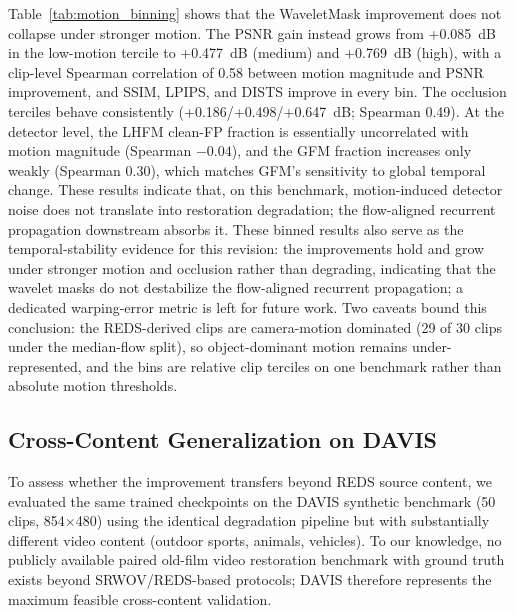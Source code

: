 {Table~\ref{tab:motion_binning} shows that the WaveletMask improvement does not collapse under stronger motion. The PSNR gain instead grows from +0.085~dB in the low-motion tercile to +0.477~dB (medium) and +0.769~dB (high), with a clip-level Spearman correlation of 0.58 between motion magnitude and PSNR improvement, and SSIM, LPIPS, and DISTS improve in every bin. The occlusion terciles behave consistently (+0.186/+0.498/+0.647~dB; Spearman 0.49). At the detector level, the LHFM clean-FP fraction is essentially uncorrelated with motion magnitude (Spearman $-0.04$), and the GFM fraction increases only weakly (Spearman 0.30), which matches GFM's sensitivity to global temporal change. These results indicate that, on this benchmark, motion-induced detector noise does not translate into restoration degradation; the flow-aligned recurrent propagation downstream absorbs it. These binned results also serve as the temporal-stability evidence for this revision: the improvements hold and grow under stronger motion and occlusion rather than degrading, indicating that the wavelet masks do not destabilize the flow-aligned recurrent propagation; a dedicated warping-error metric is left for future work. Two caveats bound this conclusion: the REDS-derived clips are camera-motion dominated (29 of 30 clips under the median-flow split), so object-dominant motion remains under-represented, and the bins are relative clip terciles on one benchmark rather than absolute motion thresholds.

\subsection{Cross-Content Generalization on DAVIS}\label{subsec:davis}

To assess whether the improvement transfers beyond REDS source content, we evaluated the same trained checkpoints on the DAVIS synthetic benchmark (50 clips, 854$\times$480) using the identical degradation pipeline but with substantially different video content (outdoor sports, animals, vehicles). To our knowledge, no publicly available paired old-film video restoration benchmark with ground truth exists beyond SRWOV/REDS-based protocols; DAVIS therefore represents the maximum feasible cross-content validation.

}
